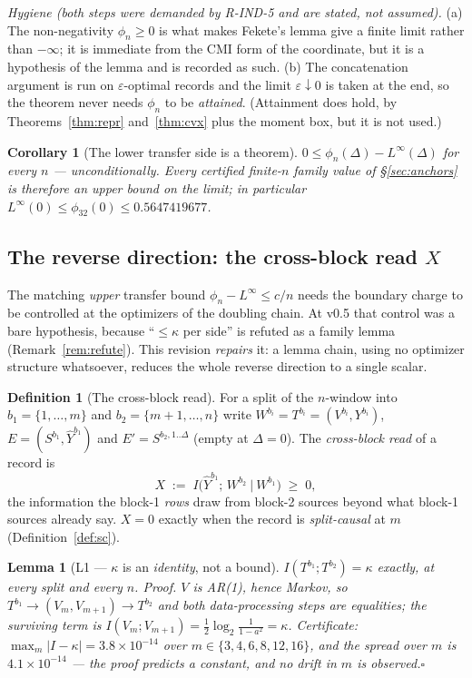 \documentclass[11pt]{article}
\newtheorem{corollary}{Corollary}
\newtheorem{lemma}{Lemma}
\theoremstyle{definition}
\newtheorem{definition}{Definition}
\theoremstyle{remark}
\begin{document}
\noindent\emph{Hygiene (both steps were demanded by R-IND-5 and are
stated, not assumed).} (a) The non-negativity $\phi_n\ge0$ is what
makes Fekete's lemma give a finite limit rather than $-\infty$; it is
immediate from the CMI form of the coordinate, but it is a hypothesis
of the lemma and is recorded as such. (b) The concatenation argument
is run on $\varepsilon$-optimal records and the limit
$\varepsilon\downarrow0$ is taken at the end, so the theorem never
needs $\phi_n$ to be \emph{attained}. (Attainment does hold, by
Theorems~\ref{thm:repr} and~\ref{thm:cvx} plus the moment box, but it
is not used.)

\begin{corollary}[The lower transfer side is a theorem]
\label{cor:lower}
$0\le\phi_n(\Delta)-L^\infty(\Delta)$ for every $n$ --- unconditionally.
Every certified finite-$n$ family value of \S\ref{sec:anchors} is
therefore an upper bound on the limit; in particular
$L^\infty(0)\le\phi_{32}(0)\le0.5647419677$.
\end{corollary}

\subsection{The reverse direction: the cross-block read $X$}
\label{sec:repair}
The matching \emph{upper} transfer bound $\phi_n-L^\infty\le c/n$ needs
the boundary charge to be controlled at the optimizers of the doubling
chain. At v0.5 that control was a bare hypothesis, because
``$\le\kappa$ per side'' is refuted as a family lemma
(Remark~\ref{rem:refute}). This revision \emph{repairs} it: a lemma
chain, using no optimizer structure whatsoever, reduces the whole
reverse direction to a single scalar.

\begin{definition}[The cross-block read]
\label{def:X}
For a split of the $n$-window into $b_1=\{1,\dots,m\}$ and
$b_2=\{m+1,\dots,n\}$ write $W^{b_i}=T^{b_i}=(V^{b_i},Y^{b_i})$,
$E=(S^{b_1},\hat Y^{b_1})$ and $E'=S^{b_2,1..\Delta}$ (empty at
$\Delta=0$). The \emph{cross-block read} of a record is
\[
X\;:=\;I\bigl(\hat Y^{b_1};\,W^{b_2}\ \big|\ W^{b_1}\bigr)\;\ge\;0 ,
\]
the information the block-1 \emph{rows} draw from block-2 sources
beyond what block-1 sources already say. $X=0$ exactly when the record
is \emph{split-causal} at $m$ (Definition~\ref{def:sc}).
\end{definition}

\begin{lemma}[L1 --- $\kappa$ is an \emph{identity}, not a bound]
\label{lem:L1}
$I(T^{b_1};T^{b_2})=\kappa$ \emph{exactly}, at every split and every
$n$. \emph{Proof.} $V$ is AR(1), hence Markov, so
$T^{b_1}\to(V_m,V_{m+1})\to T^{b_2}$ and both data-processing steps are
\emph{equalities}; the surviving term is
$I(V_m;V_{m+1})=\tfrac12\log_2\frac1{1-a^2}=\kappa$. Certificate:
$\max_m|I-\kappa|=3.8\times10^{-14}$ over $m\in\{3,4,6,8,12,16\}$, and
the spread over $m$ is $4.1\times10^{-14}$ --- the proof predicts a
constant, and no drift in $m$ is observed.\hfill$\square$
\end{lemma}
\end{document}
